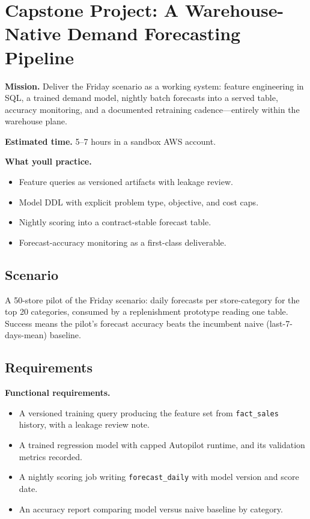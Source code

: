 \section{Capstone Project: A Warehouse-Native Demand Forecasting Pipeline}\label{sec:ch17-capstone}

\begin{capstonebox}
\textbf{Mission.} Deliver the Friday scenario as a working system: feature engineering in SQL, a trained demand model, nightly batch forecasts into a served table, accuracy monitoring, and a documented retraining cadence---entirely within the warehouse plane.

\textbf{Estimated time.} 5--7 hours in a sandbox AWS account.

\textbf{What you\textquotesingle{}ll practice.}
\begin{itemize}
    \item Feature queries as versioned artifacts with leakage review.
    \item Model DDL with explicit problem type, objective, and cost caps.
    \item Nightly scoring into a contract-stable forecast table.
    \item Forecast-accuracy monitoring as a first-class deliverable.
\end{itemize}
\end{capstonebox}

\subsection*{Scenario}
A 50-store pilot of the Friday scenario: daily forecasts per store-category for the top 20 categories, consumed by a replenishment prototype reading one table. Success means the pilot's forecast accuracy beats the incumbent naive (last-7-days-mean) baseline.

\subsection*{Requirements}
\textbf{Functional requirements.}
\begin{itemize}
    \item A versioned training query producing the feature set from \texttt{fact\_sales} history, with a leakage review note.
    \item A trained regression model with capped Autopilot runtime, and its validation metrics recorded.
    \item A nightly scoring job writing \texttt{forecast\_daily} with model version and score date.
    \item An accuracy report comparing model versus naive baseline by category.
\end{itemize}

